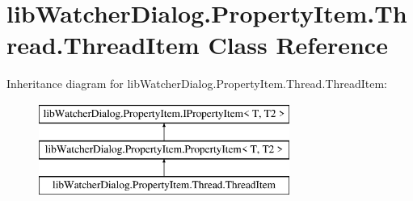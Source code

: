 \hypertarget{classlib_watcher_dialog_1_1_property_item_1_1_thread_1_1_thread_item}{\section{lib\+Watcher\+Dialog.\+Property\+Item.\+Thread.\+Thread\+Item Class Reference}
\label{classlib_watcher_dialog_1_1_property_item_1_1_thread_1_1_thread_item}
}
Inheritance diagram for lib\+Watcher\+Dialog.\+Property\+Item.\+Thread.\+Thread\+Item\+:\begin{figure}[H]
\begin{center}
\leavevmode
\includegraphics[height=3.000000cm]{classlib_watcher_dialog_1_1_property_item_1_1_thread_1_1_thread_item}
\end{center}
\end{figure}
